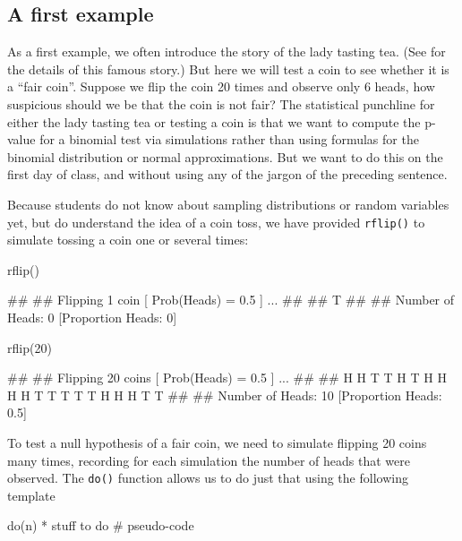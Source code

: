 \subsection{A first example}\label{a-first-example}

As a first example, we often introduce the story of the lady tasting
tea. (See \cite{Salsburg:2002} for the details of this famous story.)
But here we will test a coin to see whether it is a ``fair coin''.
Suppose we flip the coin 20 times and observe only 6 heads, how
suspicious should we be that the coin is not fair? The statistical
punchline for either the lady tasting tea or testing a coin is that we
want to compute the p-value for a binomial test via simulations rather
than using formulas for the binomial distribution or normal
approximations. But we want to do this on the first day of class, and
without using any of the jargon of the preceding sentence.

Because students do not know about sampling distributions or random
variables yet, but do understand the idea of a coin toss, we have
provided \texttt{rflip()} to simulate tossing a coin one or several
times:

\begin{Schunk}
\begin{Sinput}
rflip()
\end{Sinput}
\begin{Soutput}
## 
## Flipping 1 coin [ Prob(Heads) = 0.5 ] ...
## 
## T
## 
## Number of Heads: 0 [Proportion Heads: 0]
\end{Soutput}
\begin{Sinput}
rflip(20)
\end{Sinput}
\begin{Soutput}
## 
## Flipping 20 coins [ Prob(Heads) = 0.5 ] ...
## 
## H H T T H T H H H H T T T T T H H H T T
## 
## Number of Heads: 10 [Proportion Heads: 0.5]
\end{Soutput}
\end{Schunk}

To test a null hypothesis of a fair coin, we need to simulate flipping
20 coins many times, recording for each simulation the number of heads
that were observed. The \texttt{do()} function allows us to do just that
using the following template

\begin{Schunk}
\begin{Sinput}
do(n) * {stuff to do}             # pseudo-code
\end{Sinput}
\end{Schunk}

